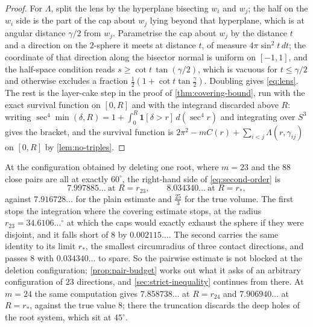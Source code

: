 \documentclass[11pt,reqno]{amsart}
\renewcommand{\_}{\origunderscore\allowbreak}
\numberwithin{equation}{section}
\theoremstyle{plain}
\theoremstyle{definition}
\theoremstyle{remark}
\begin{document}
\begin{proof}
For $\Lambda$, split the lens by the hyperplane bisecting $w_i$ and
$w_j$; the half on the $w_i$ side is the part of the cap about $w_j$
lying beyond that hyperplane, which is at angular distance $\gamma/2$
from $w_j$. Parametrise the cap about $w_j$ by the distance $t$ and a
direction on the $2$-sphere it meets at distance $t$, of measure
$4\pi\sin^2t\,dt$; the coordinate of that direction along the bisector
normal is uniform on $[-1,1]$, and the half-space condition reads
$s\ge\cot t\,\tan(\gamma/2)$, which is vacuous for $t\le\gamma/2$ and
otherwise excludes a fraction $\tfrac12(1+\cot t\tan\tfrac\gamma2)$.
Doubling gives \eqref{eq:lens}. The rest is the layer-cake step in the
proof of \cref{thm:covering-bound}, run with the exact survival function
on $[0,R]$ and with the integrand discarded above $R$: writing
$\sec^4\min(\delta,R)=1+\int_0^R\mathbf 1[\delta>r]\,d(\sec^4r)$ and
integrating over $S^3$ gives the bracket, and the survival function is
$2\pi^2-mC(r)+\sum_{i<j}\Lambda(r,\gamma_{ij})$ on $[0,R]$ by
\cref{lem:no-triples}.
\end{proof}

At the configuration obtained by deleting one root, where $m=23$ and the
$88$ close pairs are all at exactly $60^\circ$, the right-hand side of
\eqref{eq:second-order} is
\begin{equation}\label{eq:second-order-value}
  7.997885\ldots\ \text{at } R=r_{23},
  \qquad
  8.034340\ldots\ \text{at } R=r_* ,
\end{equation}
against $7.916728\ldots$ for the plain estimate and $\tfrac{25}3$ for
the true volume. The first stops the integration where the covering
estimate stops, at the radius $r_{23}=34.6106\ldots^\circ$ at which the caps would exactly
exhaust the sphere if they were disjoint, and it falls short of $8$ by
$0.002115\ldots$. The second carries the same identity to its limit
$r_*$, the smallest circumradius of three contact directions, and passes
$8$ with $0.034340\ldots$ to spare. So the pairwise estimate is not
blocked at the deletion configuration; \cref{prop:pair-budget} works out
what it asks of an arbitrary configuration of $23$ directions, and
\cref{sec:strict-inequality} continues from there. At $m=24$ the
same computation gives $7.858738\ldots$ at $R=r_{24}$ and
$7.906940\ldots$ at $R=r_*$, against the true value $8$; there the
truncation discards the deep holes of the root system, which sit at
$45^\circ$.
\end{document}
